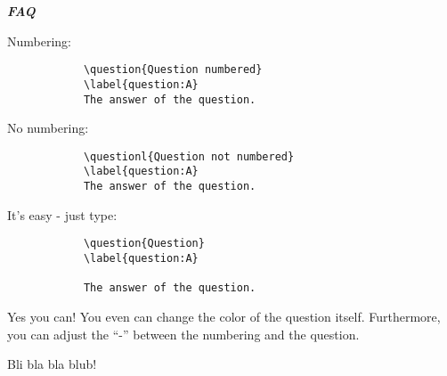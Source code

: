 \documentclass[ngerman, a4paper, 12pt, pdftex]{article}
\begin{document}
	
	\begin{center}
		\Huge{\bf \emph{FAQ}}
	\end{center}
	
	\listofquestions %
	\clearpage
	
	
		\label{question}
		
		Numbering:
		\begin{verbatim}
			\question{Question numbered}
			\label{question:A}				
			The answer of the question.
		\end{verbatim}
	
		No numbering:
		\begin{verbatim}
			\questionl{Question not numbered}
			\label{question:A}				
			The answer of the question.
		\end{verbatim}
	
		\label{question:A}
		
		It's easy - just type:
		
		\begin{verbatim}
			\question{Question}
			\label{question:A}	
			
			The answer of the question.
		\end{verbatim}
		
		\label{question:B}
		
		Yes you can! You even can change the color of the question itself. Furthermore, you can adjust the \enquote{-} between the numbering and the question. 

		\label{question:C}
		
		Bli bla bla blub!
\end{document}
